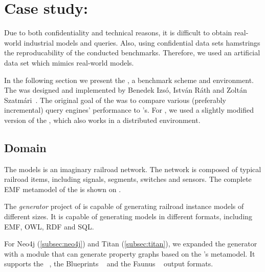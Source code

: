 \section{Case study: \tb{}}
\label{sec:trainbenchmark}

Due to both confidentiality and technical reasons, it is difficult to obtain real-world industrial models and queries. Also, using confidential data sets hamstrings the reproducability of the conducted benchmarks. Therefore, we used an artificial data set which mimics real-world models.  

In the following section we present the \textit{\tb{}}, a benchmark scheme and environment. The \tb{} was designed and implemented by Benedek Izsó, István Ráth and Zoltán Szatmári~\cite{Izso:2012:ODD:2428516.2428523}. The original goal of the \tb{} was to compare various (preferably incremental) query engines' performance to \eiq's. For \iqd, we used a slightly modified version of the \tb{}, which also works in a distributed environment.

\subsection{Domain}


The \tb{} models is an imaginary railroad network. The network is composed of typical railroad items, including signals, segments, switches and sensors. The complete EMF metamodel of the \tb{} is shown on . 

The \textit{generator} project of \tb{} is capable of generating railroad instance models of different sizes. It is capable of generating models in different formats, including EMF, OWL, RDF and SQL. 

For Neo4j (\autoref{subsec:neo4j}) and Titan (\autoref{subsec:titan}), we expanded the generator with a module that can generate property graphs based on the \tb{}'s metamodel. It supports the \graphml{}~\cite{GraphML}, the Blueprints \graphson{}~\cite{BlueprintsGraphSON} and the Faunus \graphson{}~\cite{FaunusGraphSON} output formats.


